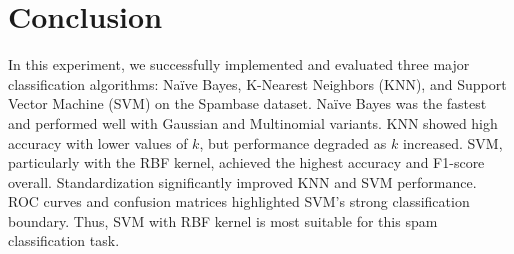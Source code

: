 \documentclass[12pt]{article}
\begin{document}
\section*{Conclusion}
In this experiment, we successfully implemented and evaluated three major classification algorithms: Na\"ive Bayes, K-Nearest Neighbors (KNN), and Support Vector Machine (SVM) on the Spambase dataset.  
Na\"ive Bayes was the fastest and performed well with Gaussian and Multinomial variants.  
KNN showed high accuracy with lower values of \( k \), but performance degraded as \( k \) increased.  
SVM, particularly with the RBF kernel, achieved the highest accuracy and F1-score overall.  
Standardization significantly improved KNN and SVM performance.  
ROC curves and confusion matrices highlighted SVM’s strong classification boundary.  
Thus, SVM with RBF kernel is most suitable for this spam classification task.
\end{document}
